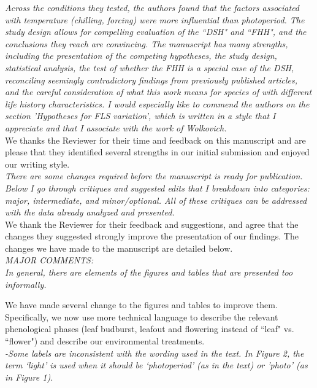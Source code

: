 \documentclass[11pt]{article}
\begin{document}
\emph{Across the conditions they tested, the authors found that the factors associated with temperature (chilling, forcing) were more influential than photoperiod. The study design allows for compelling evaluation of the ``DSH" and ``FHH", and the conclusions they reach are convincing. The manuscript has many strengths, including the presentation of the competing hypotheses, the study design, statistical analysis, the test of whether the FHH is a special case of the DSH, reconciling seemingly contradictory findings from previously published articles, and the careful consideration of what this work means for species of with different life history characteristics. I would especially like to commend the authors on the section 'Hypotheses for FLS variation', which is written in a style that I appreciate and that I associate with the work of Wolkovich.}\\

\noindent We thanks the Reviewer for their time and feedback on this manuscript and are please that they identified several strengths in our initial submission and enjoyed our writing style.\\

\emph{There are some changes required before the manuscript is ready for publication. Below I go through critiques and suggested edits that I breakdown into categories: major, intermediate, and minor/optional. All of these critiques can be addressed with the data already analyzed and presented.}\\

\noindent We thank the Reviewer for their feedback and suggestions, and agree that the changes they suggested strongly improve the presentation of our findings. The changes we have made to the manuscript are detailed below.\\

\emph{MAJOR COMMENTS:\\
In general, there are elements of the figures and tables that are presented too informally.}

\noindent We have made several change to the figures and tables to improve them. Specifically, we now use more technical language to describe the relevant phenological phases (leaf budburst, leafout and flowering instead of ``leaf" vs. ``flower") and describe our environmental treatments.  \\

\emph{-Some labels are inconsistent with the wording used in the text. In Figure 2, the term `light' is used when it should be `photoperiod' (as in the text) or 'photo' (as in Figure 1).}\\
\end{document}
